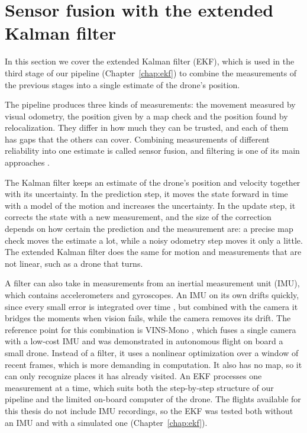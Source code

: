 \documentclass[english, Lau, oneside]{sapthesis}%
\begin{document}
\section{Sensor fusion with the extended Kalman filter}
\label{sec:bg-ekf}
In this section we cover the extended Kalman filter (EKF), which is used in the third stage of our pipeline (Chapter~\ref{chap:ekf}) to combine the measurements of the previous stages into a single estimate of the drone's position.

The pipeline produces three kinds of measurements: the movement measured by visual odometry, the position given by a map check and the position found by relocalization. They differ in how much they can be trusted, and each of them has gaps that the others can cover. Combining measurements of different reliability into one estimate is called sensor fusion, and filtering is one of its main approaches \citep{liu2025survey}.

The Kalman filter \citep{kalman1960} keeps an estimate of the drone's position and velocity together with its uncertainty. In the prediction step, it moves the state forward in time with a model of the motion and increases the uncertainty. In the update step, it corrects the state with a new measurement, and the size of the correction depends on how certain the prediction and the measurement are: a precise map check moves the estimate a lot, while a noisy odometry step moves it only a little. The extended Kalman filter does the same for motion and measurements that are not linear, such as a drone that turns.

A filter can also take in measurements from an inertial measurement unit (IMU), which contains accelerometers and gyroscopes. An IMU on its own drifts quickly, since every small error is integrated over time \citep{szykula2025deadreckoning}, but combined with the camera it bridges the moments when vision fails, while the camera removes its drift. The reference point for this combination is VINS-Mono \citep{qin2018vinsmono}, which fuses a single camera with a low-cost IMU and was demonstrated in autonomous flight on board a small drone. Instead of a filter, it uses a nonlinear optimization over a window of recent frames, which is more demanding in computation. It also has no map, so it can only recognize places it has already visited. An EKF processes one measurement at a time, which suits both the step-by-step structure of our pipeline and the limited on-board computer of the drone. The flights available for this thesis do not include IMU recordings, so the EKF was tested both without an IMU and with a simulated one (Chapter~\ref{chap:ekf}).
\end{document}
